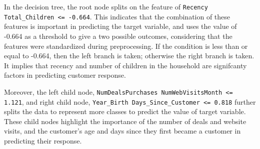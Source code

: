 In the decision tree, the root node splits on the feature of \texttt{Recency Total\_Children <= -0.664}. This indicates that the combination of these features is important in predicting the target variable, and uses the value of -0.664 as a threshold to give a two possible outcomes, considering that the features were standardized during preprocessing. If the condition is less than or equal to -0.664, then the left branch is taken; otherwise the right branch is taken. It implies that recency and number of children in the household are signifcanty factors in predicting customer response. 

Moreover, the left child node, \texttt{NumDealsPurchases NumWebVisitsMonth <= 1.121}, and right child node, \texttt{Year\_Birth Days\_Since\_Customer <= 0.818} further splits the data to represent more classes to predict the value of target variable. These child nodes highlight the importance of the number of deals and website visits, and the customer's age and days since they first became a customer in predicting their response.

